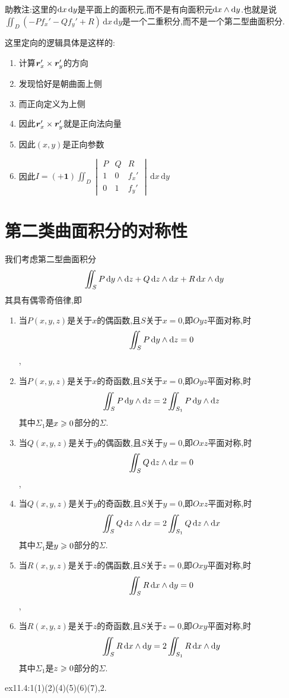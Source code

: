 \begin{remark}
    助教注:这里的$\operatorname{d\!} x \operatorname{d\!} y$是平面上的面积元,而不是有向面积元$\operatorname{d\!} x \wedge \operatorname{d\!} y$.也就是说$\iint_D (-P f_x' - Q f_y' + R) \,\mathrm{d}x\,\mathrm{d}y$是一个二重积分,而不是一个第二型曲面积分.
\end{remark}

\begin{remark}
    这里定向的逻辑具体是这样的:
    \begin{enumerate}
        \item 计算$\bm{r}_x' \times \bm{r}_y'$的方向
        \item 发现恰好是朝曲面上侧
        \item 而正向定义为上侧
        \item 因此$\bm{r}_x' \times \bm{r}_y'$就是正向法向量
        \item 因此$(x,y)$是正向参数
        \item 因此$I = \bm{(+1)} \iint_D \begin{vmatrix}
            P & Q & R \\
            1 & 0 & f_x' \\
            0 & 1 & f_y'
        \end{vmatrix} \,\mathrm{d}x\,\mathrm{d}y$
    \end{enumerate}
\end{remark}

\section{第二类曲面积分的对称性}

我们考虑第二型曲面积分$$\iint_S P \operatorname{d\!} y \wedge \operatorname{d\!} z + Q \operatorname{d\!} z \wedge \operatorname{d\!} x + R \operatorname{d\!} x \wedge \operatorname{d\!} y$$
其具有偶零奇倍律,即
\begin{enumerate}
    \item 当$P(x,y,z)$是关于$x$的偶函数,且$S$关于$x=0$,即$Oyz$平面对称,时$$\iint_S P \operatorname{d\!} y \wedge \operatorname{d\!} z = 0$$,
    \item 当$P(x,y,z)$是关于$x$的奇函数,且$S$关于$x=0$,即$Oyz$平面对称,时$$\iint_S P \operatorname{d\!} y \wedge \operatorname{d\!} z = 2 \iint_{S_1} P \operatorname{d\!} y \wedge \operatorname{d\!} z$$其中$\Sigma_1$是$x \geqslant 0$部分的$\Sigma$.
    \item 当$Q(x,y,z)$是关于$y$的偶函数,且$S$关于$y=0$,即$Oxz$平面对称,时$$\iint_S Q \operatorname{d\!} z \wedge \operatorname{d\!} x = 0$$,
    \item 当$Q(x,y,z)$是关于$y$的奇函数,且$S$关于$y=0$,即$Oxz$平面对称,时$$\iint_S Q \operatorname{d\!} z \wedge \operatorname{d\!} x = 2 \iint_{S_1} Q \operatorname{d\!} z \wedge \operatorname{d\!} x$$其中$\Sigma_1$是$y \geqslant 0$部分的$\Sigma$.
    \item 当$R(x,y,z)$是关于$z$的偶函数,且$S$关于$z=0$,即$Oxy$平面对称,时$$\iint_S R \operatorname{d\!} x \wedge \operatorname{d\!} y = 0$$,
    \item 当$R(x,y,z)$是关于$z$的奇函数,且$S$关于$z=0$,即$Oxy$平面对称,时$$\iint_S R \operatorname{d\!} x \wedge \operatorname{d\!} y = 2 \iint_{S_1} R \operatorname{d\!} x \wedge \operatorname{d\!} y$$其中$\Sigma_1$是$z \geqslant 0$部分的$\Sigma$.
\end{enumerate}


\begin{homework}
ex11.4:1(1)(2)(4)(5)(6)(7),2.
\end{homework}











